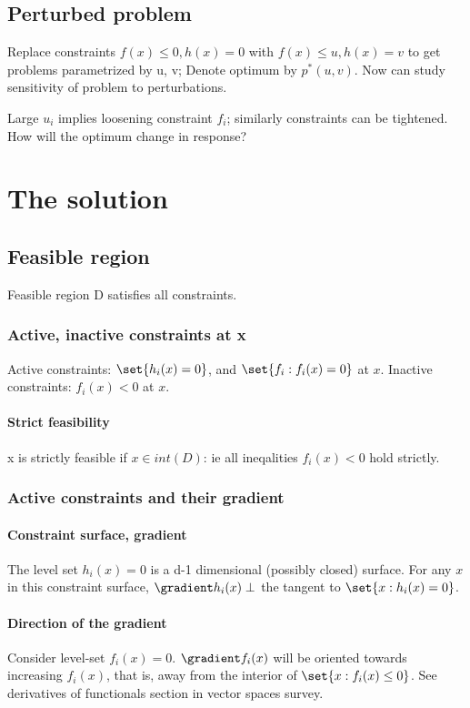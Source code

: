 \documentclass[oneside, article]{memoir}
\begin{document}
\section{Perturbed problem}
Replace constraints $f(x) \leq 0, h(x) = 0$ with $f(x) \leq u, h(x) = v$ to get problems parametrized by u, v; Denote optimum by $p^{*}(u, v)$. Now can study sensitivity of problem to perturbations.

Large $u_i$ implies loosening constraint $f_i$; similarly constraints can be tightened. How will the optimum change in response?

\chapter{The solution}
\section{Feasible region}
Feasible region D satisfies all constraints.

\subsection{Active, inactive constraints at x}
Active constraints: $\set{h_i(x) = 0}$, and $\set{f_i: f_i(x) = 0}$ at $x$. Inactive constraints: $f_i(x) < 0$ at $x$.

\subsubsection{Strict feasibility}
x is strictly feasible if $x \in int(D)$: ie all ineqalities $f_i(x) < 0$ hold strictly.

\subsection{Active constraints and their gradient}
\subsubsection{Constraint surface, gradient}
The level set $h_i(x) = 0$ is a d-1 dimensional (possibly closed) surface. For any $x$ in this constraint surface, $\gradient h_i(x) \perp$ the tangent to $\set{x: h_i(x) = 0}$.

\subsubsection{Direction of the gradient}
Consider level-set $f_i(x) = 0$. $\gradient f_i(x)$ will be oriented towards increasing $f_i(x)$, that is, away from the interior of $\set{x: f_i(x) \leq 0}$. See derivatives of functionals section in vector spaces survey.
\end{document}

